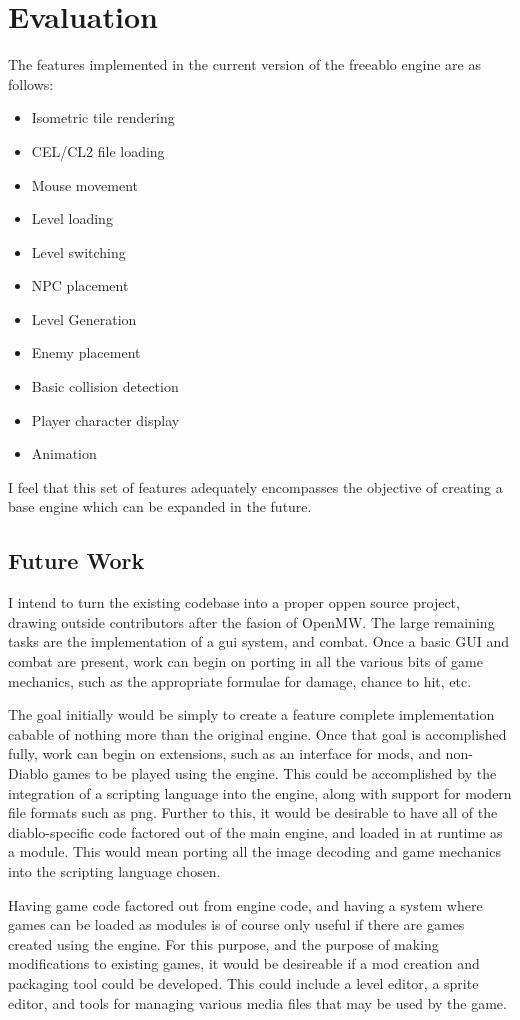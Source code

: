 \section{Evaluation}
	The features implemented in the current version of the freeablo engine are as follows:\\
	\begin{itemize}
		\item{Isometric tile rendering}
		\item{CEL/CL2 file loading}
		\item{Mouse movement}
		\item{Level loading}
		\item{Level switching}
		\item{NPC placement}
		\item{Level Generation}
		\item{Enemy placement}
		\item{Basic collision detection}
		\item{Player character display}
		\item{Animation}
	\end{itemize}
	
	I feel that this set of features adequately encompasses the objective of creating a base engine which can be expanded in the future.
	
	\subsection{Future Work}
	I intend to turn the existing codebase into a proper oppen source project, drawing outside contributors after the fasion of OpenMW\cite{openmw}. The large remaining tasks are the implementation of a gui system, and combat.
	Once a basic GUI and combat are present, work can begin on porting in all the various bits of game mechanics, such as the appropriate formulae for damage, chance to hit, etc. 
	
	The goal initially would be simply to create a feature complete implementation cabable of nothing more than the original engine. Once that goal is accomplished fully, work can begin on extensions, such as an interface for mods, and non-Diablo games to be played using the engine.
	This could be accomplished by the integration of a scripting language into the engine, along with support for modern file formats such as png. 
	Further to this, it would be desirable to have all of the diablo-specific code factored out of the main engine, and loaded in at runtime as a module. This would mean porting all the image decoding and game mechanics into the scripting language chosen.
	
 	Having game code factored out from engine code, and having a system where games can be loaded as modules is of course only useful if there are games created using the engine. For this purpose, and the purpose of making modifications to existing games, it would be desireable if a mod creation and packaging tool could be developed.
 	This could include a level editor, a sprite editor, and tools for managing various media files that may be used by the game.
	
